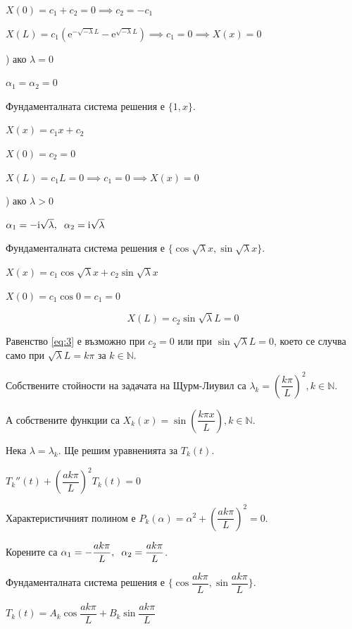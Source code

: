 \documentclass[14pt]{extarticle}
\let\frac\dfrac
\newcommand{\me}{\mathrm{e}}
\newcommand{\mi}{\mathrm{i}}
\begin{document}
$X(0) = c_1 + c_2 = 0 \implies c_2 = -c_1$

$X(L) = c_1\left( \me^{-\sqrt{-\lambda}L} - \me^{\sqrt{-\lambda}L} \right) \implies c_1 = 0 \implies X(x) = 0$

) ако $\lambda = 0$

$ \alpha_1 = \alpha_2 = 0 $

Фундаменталната система решения е $\{1, x\}$.

$X(x) = c_1x + c_2$

$X(0) = c_2 = 0$

$X(L) = c_1L = 0 \implies c_1 = 0 \implies X(x) = 0$

) ако $\lambda > 0$

$ \alpha_1 = -\mi\sqrt{\lambda}, \hspace{2mm} \alpha_2 = \mi\sqrt{\lambda} $

Фундаменталната система решения е $\{ \cos \sqrt{\lambda}x, \sin \sqrt{\lambda}x \}$.

$X(x) = c_1\cos \sqrt{\lambda}x + c_2\sin \sqrt{\lambda}x$

$X(0) = c_1 \cos 0 = c_1 = 0$

\begin{equation}
X(L) = c_2\sin\sqrt{\lambda}L = 0 \tag{3}\label{eq:3}
\end{equation}

Равенство \eqref{eq:3} е възможно при $c_2 = 0$ или при $\sin\sqrt{\lambda}L = 0$, което се случва само при $\sqrt{\lambda}L = k\pi$ за $k \in \mathbb{N}$.

Собствените стойности на задачата на Щурм-Лиувил са $\lambda_k = \left( \frac{k\pi}{L} \right)^2 , k \in \mathbb{N}$.

А собствените функции са $X_k(x) = \sin \left( \frac{k\pi x}{L} \right) , k \in \mathbb{N}$.

Нека $\lambda = \lambda_k$. Ще решим уравненията за $T_k(t)$.

$ T_k''(t) + \left( \frac{ak\pi}{L} \right)^2T_k(t) = 0 $

Характеристичният полином е $ P_k(\alpha) = \alpha^2 + \left( \frac{ak\pi}{L} \right)^2 = 0$.

Корените са $\alpha_1 = -\frac{ak\pi}{L}, \hspace{2mm} \alpha_2 = \frac{ak\pi}{L}$.

Фундаменталната система решения е $\{ \cos\frac{ak\pi}{L}, \sin\frac{ak\pi}{L} \}$.

$T_k(t) = A_k\cos\frac{ak\pi}{L} + B_k\sin\frac{ak\pi}{L}$
\end{document}
